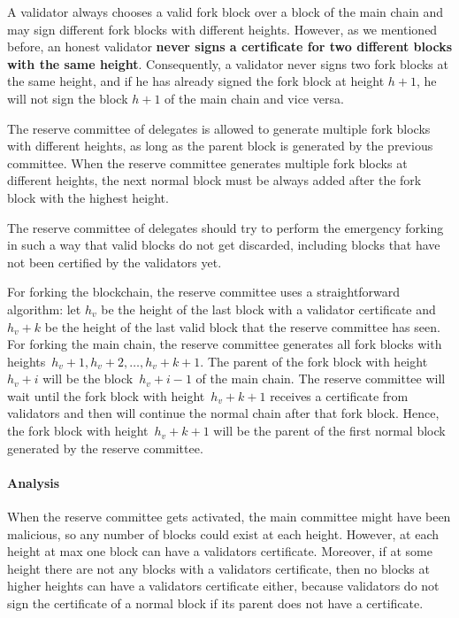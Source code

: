 A validator always chooses a valid fork block over a block of the main chain and may sign different fork
blocks with different heights. However, as we mentioned before, an honest validator
\textbf{never signs a certificate for two different blocks with the same height}. Consequently, a validator never
signs two fork blocks at the same height, and if he has already signed the fork block at height $h+1$, he will not
sign the block $h+1$ of the main chain and vice versa.

The reserve committee of delegates is allowed to generate multiple fork blocks with different heights, as long as the
parent block is generated by the previous committee. When the reserve committee generates multiple fork blocks
at different heights, the next normal block must be always added after the fork block with the highest height.

The reserve committee of delegates should try to perform the emergency forking in such a way that
valid blocks do not get discarded, including blocks that have not been certified by the validators yet.

For forking the blockchain, the reserve committee uses a straightforward algorithm: let $h_v$ be the height of the last
block with a validator certificate and $h_v+k$ be the height of the last valid block that the reserve committee has
seen. For forking the main chain, the reserve committee generates all fork blocks with heights~$h_v+1,h_v+2,\dots,
h_v+k+1$. The parent of the fork block with height $h_v+i$ will be the block~$h_v+i-1$ of the main chain. The
reserve committee will wait until the fork block with height~$h_v+k+1$ receives a certificate from validators and
then will continue the normal chain after that fork block. Hence, the fork block with height~$h_v+k+1$
will be the parent of the first normal block generated by the reserve committee.

\paragraph{Analysis}

When the reserve committee gets activated, the main committee might have been malicious, so any number of blocks could
exist at each height. However, at each height at max one block can have a validators certificate. Moreover, if at some
height there are not any blocks with a validators certificate, then no blocks at higher heights can have a
validators certificate either, because validators do not sign the certificate of a normal block if its parent does
not have a certificate.

